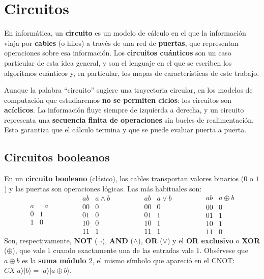 \documentclass[11pt, a4paper, twoside, openright]{report}
\begin{document}
\section{Circuitos}

\noindent En informática, un \textbf{circuito} es un modelo de cálculo en el que la información viaja por \textbf{cables} (o hilos) a través de una red de \textbf{puertas}, que representan operaciones sobre esa información. Los \textbf{circuitos cuánticos} son un caso particular de esta idea general, y son el lenguaje en el que se escriben los algoritmos cuánticos y, en particular, los mapas de características de este trabajo.

\noindent Aunque la palabra ``circuito'' sugiere una trayectoria circular, en los modelos de computación que estudiaremos \textbf{no se permiten ciclos}: los circuitos son \textbf{acíclicos}. La información fluye siempre de izquierda a derecha, y un circuito representa una \textbf{secuencia finita de operaciones} sin bucles de realimentación. Esto garantiza que el cálculo termina y que se puede evaluar puerta a puerta.

\subsection{Circuitos booleanos}

\noindent En un \textbf{circuito booleano} (clásico), los cables transportan valores binarios ($0$ o $1$) y las puertas son operaciones lógicas. Las más habituales son:
\[
\begin{array}{c|c}
a & \neg a \\ \hline 0 & 1 \\ 1 & 0
\end{array}
\qquad\qquad
\begin{array}{c|c}
ab & a\wedge b \\ \hline 00 & 0\\ 01 & 0 \\ 10 & 0 \\ 11 & 1
\end{array}
\qquad\qquad
\begin{array}{c|c}
ab & a\vee b \\ \hline 00 & 0\\ 01 & 1 \\ 10 & 1 \\ 11 & 1
\end{array}
\qquad\qquad
\begin{array}{c|c}
ab & a\oplus b \\ \hline 00 & 0\\ 01 & 1 \\ 10 & 1 \\ 11 & 0
\end{array}
\]
Son, respectivamente, \textbf{NOT} ($\neg$), \textbf{AND} ($\wedge$), \textbf{OR} ($\vee$) y el \textbf{OR exclusivo} o \textbf{XOR} ($\oplus$), que vale $1$ cuando exactamente una de las entradas vale $1$. Obsérvese que $a\oplus b$ es la \textbf{suma módulo $2$}, el mismo símbolo que apareció en el CNOT: $CX|a\rangle|b\rangle = |a\rangle|a\oplus b\rangle$.
\end{document}
